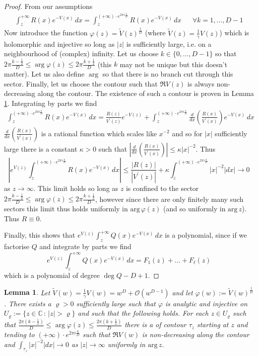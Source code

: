 \documentclass[12pt]{article}
\newtheorem{lemma}[theorem]{Lemma}
\theoremstyle{definition}
\begin{document}
\begin{proof}
From our assumptions
\begin{align*}
\int_z^{+\infty} R(x) e^{-V(x)} \, dx = \int_z^{(+\infty) \cdot e^{2\pi i \frac{k}{D}}} R(x) e^{-V(x)} \, dx & & \forall k = 1, \dots, D-1
\end{align*}
Now introduce the function $\varphi(z) = \tilde{V}(z)^\frac{1}{D}$ (where $\tilde{V}(z) = \frac{1}{\gamma}V(z)$) which is holomorphic and injective so long as $|z|$ is sufficiently large, i.e. on a neighbourhood of (complex) infinity.  Let us choose $k \in \{0, \dots, D-1\}$ so that $ 2\pi \frac{k-\frac{1}{2}}{D} \leq \arg \varphi(z) \leq 2\pi \frac{k+\frac{1}{2}}{D}$ (this $k$ may not be unique but this doesn't matter).  Let us also define $\arg$ so that there is no branch cut through this sector.  Finally, let us choose the contour such that $\Re V(z)$ is always non-decreasing along the contour. The existence of such a contour is proven in Lemma \ref{contour}. Integrating by parts we find
\begin{align*}
\int_z^{(+\infty) \cdot e^{2\pi i \frac{k}{D}}} R(x) e^{-V(x)} \, dx = \frac{R(z)}{V^\prime(z)} e^{-V(z)}+ \int_z^{(+\infty) \cdot e^{2\pi i \frac{k}{D}}}  \frac{d}{dx}\left( \frac{R(x)}{V^\prime(x)} \right) e^{-V(x)} \, dx
\end{align*}
$\frac{d}{dx}\left( \frac{R(x)}{V^\prime(x)} \right)$ is a rational function which scales like $x^{-2}$ and so for $|x|$ sufficiently large there is a constant $\kappa>0$ such that $\left| \frac{d}{dx}\left( \frac{R(x)}{V^\prime(x)} \right)\right| \leq \kappa |x|^{-2}$. Thus
$$\left|e^{V(z)} \int_z^{(+\infty) \cdot e^{2\pi i \frac{k}{D}}} R(x) e^{-V(x)} \, dx\right| \leq \frac{|R(z)|}{|V^\prime(z)|}+ \kappa\int_z^{(+\infty) \cdot e^{2\pi i \frac{k}{D}}}|x|^{-2} |dx| \to 0$$
as $z \to \infty$.  This limit holds so long as $z$ is confined to the sector $ 2\pi \frac{k-\frac{1}{2}}{D} \leq \arg \varphi(z) \leq 2\pi \frac{k+\frac{1}{2}}{D}$, however since there are only finitely many such sectors this limit thus holds uniformly in $\mathrm{arg} \, \varphi(z)$ (and so uniformly in $\mathrm{arg} \, z$).  Thus $R \equiv 0$.

Finally, this shows that $e^{V(z)} \int_z^{+\infty} Q(x) e^{-V(x)}\, dx$ is a polynomial, since if we factorise $Q$ and integrate by parts we find 
$$e^{V(z)} \int_z^{+\infty} Q(x) e^{-V(x)}\, dx  = F_1(z) + \dots + F_\ell(z)$$
which is a polynomial of degree $\deg Q - D + 1$.
\end{proof}
\begin{lemma}\label{contour} Let $\tilde{V}(w) = \frac{1}{\gamma}V(w) = w^D + \mathcal{O}(w^{D-1})$ and let $\varphi(w) := \tilde{V}(w)^\frac{1}{D}$. There exists a $\varrho > 0$ sufficiently large such that $\varphi$ is analytic and injective on $U_\varrho := \{ z \in \mathbb{C}\, : \, |z| > \varrho \}$ and such that the following holds.  For each $z \in U_\varrho$  such that 
$\frac{2\pi ( k - \frac{1}{2})}{D} \leq \arg \varphi(z) \leq \frac{2\pi ( k + \frac{1}{2})}{D}$
there is a of contour $\tau_z$ starting at $z$ and tending to $(+\infty) \cdot e^{2\pi i \frac{k}{D}}$ such that $\Re V(w)$ is non-decreasing along the contour and $\int_{\tau_z}|x|^{-2} |dx| \to 0$ as $|z| \to \infty$ uniformly in $\mathrm{arg} \, z$.
\end{lemma}
\end{document}
